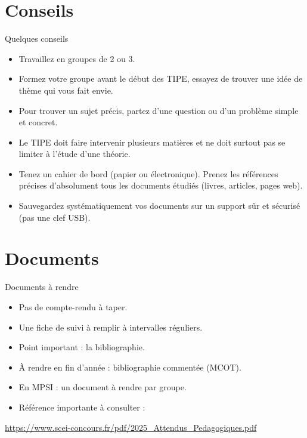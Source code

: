 \documentclass{beamer}
\begin{document}
\section{Conseils}
\begin{frame}{Quelques conseils}
    \begin{itemize}
        \item Travaillez en groupes de 2 ou 3.
        \item Formez votre groupe avant le début des TIPE, essayez de trouver une idée de thème qui vous fait envie. 
        \item Pour trouver un sujet précis, partez d'une question ou d'un problème simple et concret. 
        \item Le TIPE doit faire intervenir plusieurs matières et ne doit surtout pas se limiter à l'étude d'une théorie. 
        \item Tenez un cahier de bord (papier ou électronique). Prenez les références précises d'absolument tous les documents étudiés (livres, articles, pages web). 
        \item Sauvegardez systématiquement vos documents sur un support sûr et sécurisé (pas une clef USB). 
    \end{itemize}
\end{frame}

\section{Documents}
\begin{frame}{Documents à rendre}
    \begin{itemize}
        \item Pas de compte-rendu à taper. 
        \item Une fiche de suivi à remplir à intervalles réguliers. 
        \item Point important : la bibliographie. 
        \item À rendre en fin d'année : bibliographie commentée (MCOT). 
        \item En MPSI : un document à rendre par groupe. 
        \item Référence importante à consulter : 
    \end{itemize}

    \begin{center}
        \url{https://www.scei-concours.fr/pdf/2025_Attendus_Pedagogiques.pdf}
    \end{center}
\end{frame}
\end{document}
